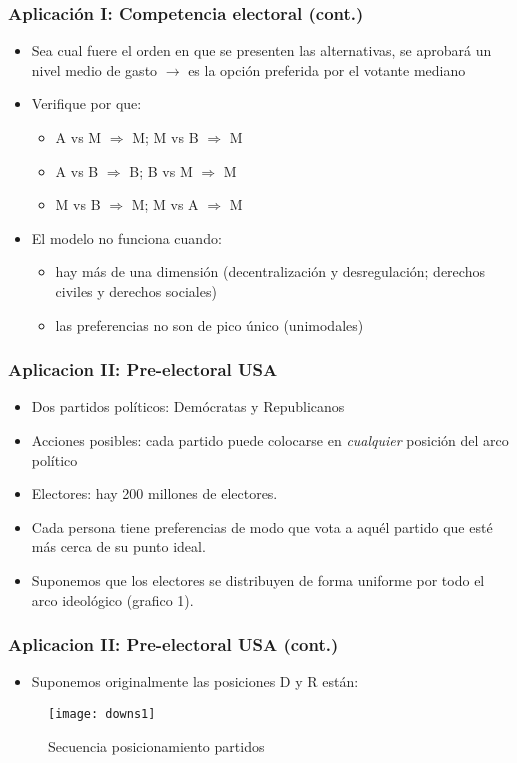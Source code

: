 \documentclass[14pt,aspectratio=169]{beamer}
\begin{document}
\begin{frame}\frametitle{Aplicación I: Competencia electoral (cont.)}
\begin{itemize}
\item Sea cual fuere el orden en que se presenten las alternativas, se
  aprobará un nivel medio de gasto $\longrightarrow$ es la opción
  preferida por el votante mediano
\item Verifique por que:
\begin{itemize}\itemsep 5pt
\item A vs M $\Rightarrow$ M; M vs B $\Rightarrow$ M
\item A vs B $\Rightarrow$ B; B vs M $\Rightarrow$ M
\item M vs B $\Rightarrow$ M; M vs A $\Rightarrow$ M
\end{itemize}
\item El modelo no funciona cuando:
\begin{itemize}\itemsep 5pt
\item hay más de
  una dimensión (decentralización y desregulación; derechos civiles y
  derechos sociales)
\item las preferencias no son de pico único (unimodales)
\end{itemize}
\end{itemize}
\end{frame}


\begin{frame}\frametitle{Aplicacion II: Pre-electoral USA}
\begin{itemize}
\item Dos partidos políticos: Demócratas y Republicanos
\item Acciones posibles: cada partido puede colocarse en
  \textit{cualquier} posición del arco político
\item Electores: hay 200 millones de electores. 
\item Cada persona tiene preferencias de modo que vota a aquél partido
  que esté más cerca de su punto ideal. 
\item Suponemos que los electores se distribuyen de forma uniforme por
  todo el arco ideológico (grafico 1). 
\end{itemize}
\end{frame}

\begin{frame}\frametitle{Aplicacion II: Pre-electoral USA (cont.)}
\begin{itemize}
\item Suponemos originalmente las posiciones D y R están:
\end{itemize}
\begin{figure}[htbp] \vspace{-1cm}
  \centering
  \texttt{[image: downs1]} \vspace{-1cm}
  \caption{Secuencia posicionamiento partidos}
  \label{fig:3}
\end{figure}
\end{frame}
\end{document}
